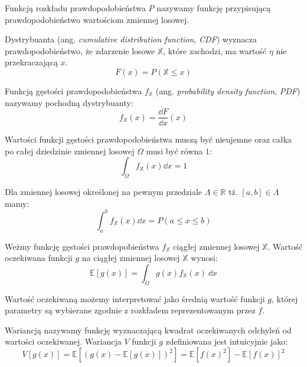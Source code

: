 \documentclass[../main.tex]{subfiles}
\begin{document}
Funkcją rozkładu prawdopodobieństwa $P$ nazywamy funkcję przypisującą prawdopodobieństwo wartościom zmiennej losowej. 

Dystrybuanta (ang. \textit{cumulative distribution function}, \textit{CDF}) wyznacza prawdopodobieństwo, że zdarzenie losowe $\mathbb{X}$, które zachodzi, ma wartość $\eta$ nie przekraczającą $x$.
\begin{equation}
    F(x) = P(\mathbb{X} \leq x)
\end{equation}

Funkcją gęstości prawdopodobieństwa $f_{\mathbb{X}}$ (ang. \textit{probability density function}, \textit{PDF}) nazywamy pochodną dystrybuanty:
\begin{equation}
    f_{\mathbb{X}}(x) = \frac{\dd F}{\dd x}(x)
\end{equation}

Wartości funkcji gęstości prawdopodobieństwa muszą być nieujemne oraz całka po całej dziedzinie zmiennej losowej $\Omega$ musi być równa $1$:
\begin{equation}
    \int_{\Omega} f_{\mathbb{X}}(x) \dd x = 1
\end{equation}

Dla zmiennej losowej określonej na pewnym przedziale $\Lambda \in \mathbb{R}$ tż. $[a,b] \in \Lambda$ mamy:
\begin{equation}
    \int_{a}^{b} f_{\mathbb{X}}(x) \dd x = P(a \leq x \leq b)
\end{equation}

Weżmy funkcję gęstości prawdopobieństwa $f_{\mathbb{X}}$ ciągłej zmiennej losowej $\mathbb{X}$. Wartość oczekiwana funkcji $g$ na ciągłej zmiennej losowej $\mathbb{X}$ wynosi:
\begin{equation}
\mathbb{E}\left[ g(x) \right] =
\int_{\Omega}{
	g(x) f_{\mathbb{X}}(x)
	\: \dd x
}
\end{equation}

Wartość oczekiwaną możemy interpretować jako średnią wartość funkcji $g$, której parametry są wybierane zgodnie z rozkładem reprezentowanym przez $f$.

Wariancją nazywamy funkcję wyznaczającą kwadrat oczekiwanych odchyleń od wartości oczekiwanej. Wariancja $V$ funkcji $g$ zdefiniowana jest intuicyjnie jako:
\begin{equation}
V\left[ g(x) \right] 
	=
	\mathbb{E}\left[ 
		\left( 
			g(x) - \mathbb{E}\left[ g(x) \right] 
		\right)^2 
	\right]
	=
	\mathbb{E}\left[
		f(x)^2
	\right] - \mathbb{E}\left[
		f(x)
	\right]^2
 \end{equation}
\end{document}
